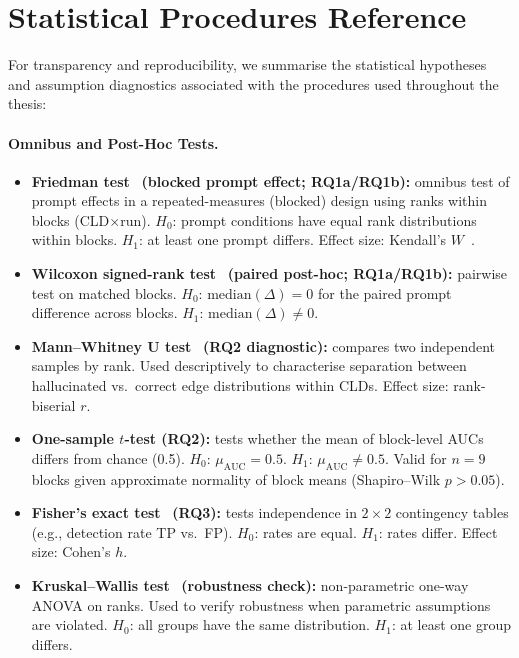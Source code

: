 \chapter{Statistical Procedures Reference}
\label{app:statistical_procedures_reference}

For transparency and reproducibility, we summarise the statistical hypotheses and assumption diagnostics associated with the procedures used throughout the thesis:

\subsubsection{Omnibus and Post-Hoc Tests.}
\begin{itemize}[noitemsep]
    \item \textbf{Friedman test}~\cite{friedman1937use} \textbf{(blocked prompt effect; RQ1a/RQ1b):} omnibus test of prompt effects in a repeated-measures (blocked) design using ranks within blocks (CLD$\times$run). $H_0$: prompt conditions have equal rank distributions within blocks. $H_1$: at least one prompt differs. Effect size: Kendall's $W$~\cite{kendall1939problem}.
    \item \textbf{Wilcoxon signed-rank test}~\cite{wilcoxon1945individual} \textbf{(paired post-hoc; RQ1a/RQ1b):} pairwise test on matched blocks. $H_0$: $\mathrm{median}(\Delta)=0$ for the paired prompt difference across blocks. $H_1$: $\mathrm{median}(\Delta)\neq 0$.
    \item \textbf{Mann--Whitney U test}~\cite{mann1947test} \textbf{(RQ2 diagnostic):} compares two independent samples by rank. Used descriptively to characterise separation between hallucinated vs.\ correct edge distributions within CLDs. Effect size: rank-biserial $r$.
    \item \textbf{One-sample $t$-test (RQ2):} tests whether the mean of block-level AUCs differs from chance (0.5). $H_0$: $\mu_{\text{AUC}}=0.5$. $H_1$: $\mu_{\text{AUC}}\neq 0.5$. Valid for $n=9$ blocks given approximate normality of block means (Shapiro--Wilk $p>0.05$).
    \item \textbf{Fisher's exact test}~\cite{fisher1922interpretation} \textbf{(RQ3):} tests independence in $2\times2$ contingency tables (e.g., detection rate TP vs.\ FP). $H_0$: rates are equal. $H_1$: rates differ. Effect size: Cohen's $h$.
    \item \textbf{Kruskal--Wallis test}~\cite{kruskal1952use} \textbf{(robustness check):} non-parametric one-way ANOVA on ranks. Used to verify robustness when parametric assumptions are violated. $H_0$: all groups have the same distribution. $H_1$: at least one group differs.
\end{itemize}

